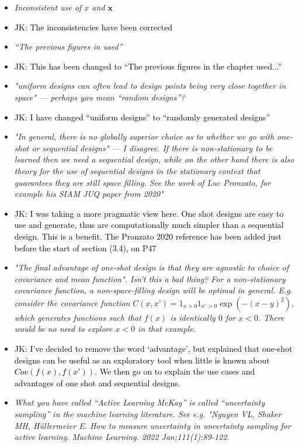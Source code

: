 \documentclass[12pt]{article}
\newcommand{\bx}{\bm{x}}
\newcommand{\done}[2]{\item[#1]\textit{#2}}
\newcommand{\jack}[1]{\item{\textcolor{black}{JK: #1}}}
\begin{document}
\begin{itemize}
\done{P43}{Inconsistent use of $x$ and $\bx$}

\jack{The inconsistencies have been corrected}

\done{P44}{``The previous figures in used''}

\jack{This has been changed to ``The previous figures in the chapter used...''}

\done{P44}{"uniform designs can often lead to design points being very close together in space" --- perhaps you mean ``random designs''?}

\jack{I have changed ``uniform designs'' to ``randomly generated designs''}

\done{P44}{"In general, there is no globally superior choice as to whether we go with one-shot or sequential designs" --- I disagree.  If there is non-stationary to be learned then we need a sequential design, while on the other hand there is also theory for the use of sequential designs in the stationary context that guarantees they are still space filling.  See the work of Luc Pronzato, for example his SIAM JUQ paper from 2020"}

\jack{I was taking a more pragmatic view here. One shot designs are easy to use and generate, thus are computationally much simpler than a sequential design. This is a benefit. The Pronzato 2020 reference has been added just before the start of section (3.4), on P47 }

\done{P45}{"The final advantage of one-shot design is that they are agnostic to choice of covariance and mean function".  Isn’t this a bad thing?  For a non-stationary covariance function, a non-space-filling design will be optimal in general.  E.g. consider the covariance function $C(x,x’) = 1_{x>0} 1_{x’>0} \exp (-(x-y)^2)$, which generates functions such that $f(x)$ is identically $0$ for $x < 0$.  There would be no need to explore $x < 0$ in that example.}

\jack{I've decided to remove the word `advantage', but explained that one-shot designs can be useful as an exploratory tool when little is known about $Cov(f(x), f(x'))$. We then go on to explain the use cases and advantages of one shot and sequential designs.}

\done{P46}{What you have called ``Active Learning McKay'' is called ``uncertainty sampling'' in the machine learning literature.  See e.g. "Nguyen VL, Shaker MH, Hüllermeier E. How to measure uncertainty in uncertainty sampling for active learning. Machine Learning. 2022 Jan;111(1):89-122.}


\end{itemize}
\end{document}

